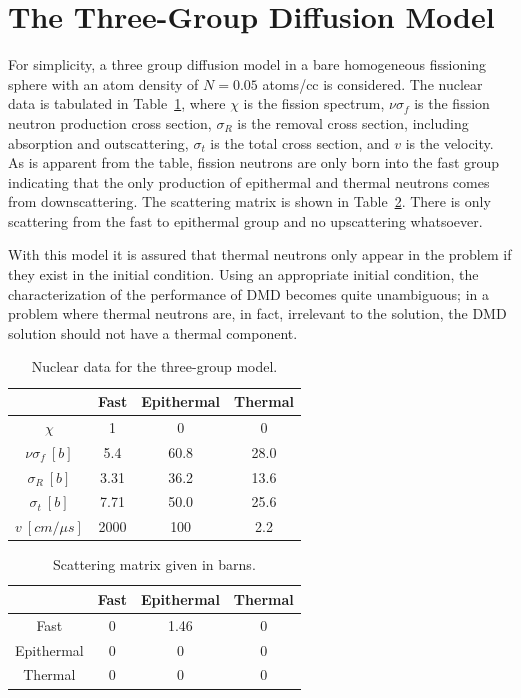 \documentclass{style/nseJournal}
\newcommand{\LTA}[1]{\label{ta:#1}}
\newcommand{\TA}[1]{Table~\ref{ta:#1}}
\newcommand{\bt}{\begin{table}}
\newcommand{\et}{\end{table}}
\newcommand{\btb}{\begin{center}\begin{tabular}}
\newcommand{\etb}{\end{tabular}\end{center}}
\begin{document}
\section{The Three-Group Diffusion Model}
For simplicity, a three group diffusion model in a bare homogeneous fissioning sphere with an atom density of $N=0.05$ atoms/cc is considered.  
The nuclear data is tabulated in \TA{xs_data}, where $\chi$ is the fission spectrum, $\nu\sigma_f$ is the fission neutron production cross section, $\sigma_R$ is the removal cross section, including absorption and outscattering, $\sigma_t$ is the total cross section, and $v$ is the velocity.  
As is apparent from the table, fission neutrons are only born into the fast group indicating that the only production of epithermal and thermal neutrons comes from downscattering.  
The scattering matrix is shown in \TA{scat}.  
There is only scattering from the fast to epithermal group and no upscattering 
whatsoever.  

With this model it is assured that thermal neutrons only appear in the problem if they exist in the initial condition.  
Using an appropriate initial condition, the characterization of the performance of DMD becomes quite unambiguous; in a problem where thermal neutrons are, in fact, irrelevant to the solution, the DMD solution should not have a thermal component.  
\bt[h] \centering 
	\caption{Nuclear data for the three-group model.} 
	\btb{|c|c|c|c|}
		\hline
		\diagbox{Reaction}{Group} & Fast  & Epithermal  & Thermal  \\  \hline
		$\chi$  & 1 & 0 & 0 \\ 	\hline
		$\nu\sigma_f \ [b]$ & 5.4 & 60.8 & 28.0 \\  \hline
		$\sigma_R \ [b]$  & 3.31 & 36.2 & 13.6 \\  \hline
		$\sigma_t \ [b]$ & 7.71 & 50.0 & 25.6\\ \hline
		$v \ [cm/\mu s]$ & 2000 & 100 & 2.2 \\  \hline
	\etb 
	 \LTA{xs_data}
\et

\bt[h] \centering 
	\caption{Scattering matrix given in barns.} 
	\btb{|c|c|c|c|}
		\hline
		\diagbox{From}{To}& Fast  & Epithermal  & Thermal  \\  \hline
		Fast  & 0 & 1.46 & 0 \\  \hline
		Epithermal & 0 & 0 & 0 \\  \hline
		Thermal  & 0 & 0 & 0 \\  \hline
	\etb 
	\LTA{scat}
\et
\end{document}
